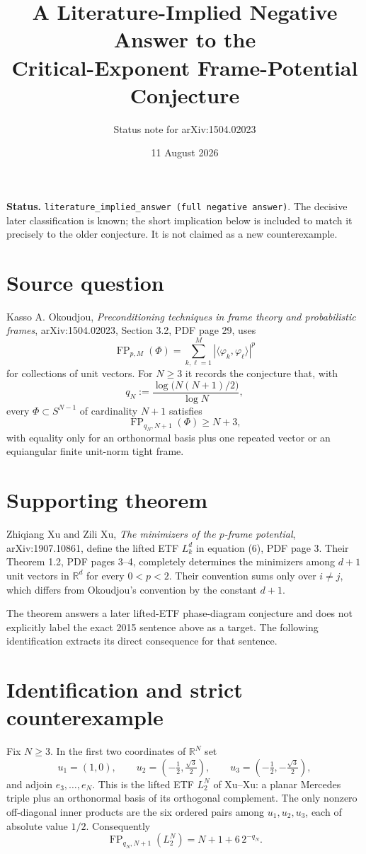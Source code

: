 \documentclass[11pt]{article}
\title{A Literature-Implied Negative Answer to the\\
Critical-Exponent Frame-Potential Conjecture}
\author{Status note for arXiv:1504.02023}
\date{11 August 2026}
\newcommand{\FP}{\operatorname{FP}}
\newcommand{\R}{\mathbb{R}}
\begin{document}
\maketitle

\noindent\textbf{Status.}
\texttt{literature\_implied\_answer (full negative answer)}.  The decisive
later classification is known; the short implication below is included to
match it precisely to the older conjecture.  It is not claimed as a new
counterexample.

\section*{Source question}

Kasso A. Okoudjou, \emph{Preconditioning techniques in frame theory and
probabilistic frames}, arXiv:1504.02023, Section 3.2, PDF page 29, uses
\[
  \FP_{p,M}(\Phi)=\sum_{k,\ell=1}^{M}
  |\langle\varphi_k,\varphi_\ell\rangle|^p
\]
for collections of unit vectors.  For $N\ge3$ it records the conjecture that,
with
\[
  q_N:=\frac{\log\!\bigl(N(N+1)/2\bigr)}{\log N},
\]
every $\Phi\subset S^{N-1}$ of cardinality $N+1$ satisfies
\[
  \FP_{q_N,N+1}(\Phi)\ge N+3,
\]
with equality only for an orthonormal basis plus one repeated vector or an
equiangular finite unit-norm tight frame.

\section*{Supporting theorem}

Zhiqiang Xu and Zili Xu, \emph{The minimizers of the $p$-frame potential},
arXiv:1907.10861, define the lifted ETF $L_k^d$ in equation (6), PDF page 3.
Their Theorem 1.2, PDF pages 3--4, completely determines the minimizers among
$d+1$ unit vectors in $\R^d$ for every $0<p<2$.  Their convention sums only
over $i\ne j$, which differs from Okoudjou's convention by the constant
$d+1$.

The theorem answers a later lifted-ETF phase-diagram conjecture and does not
explicitly label the exact 2015 sentence above as a target.  The following
identification extracts its direct consequence for that sentence.

\section*{Identification and strict counterexample}

Fix $N\ge3$.  In the first two coordinates of $\R^N$ set
\[
 u_1=(1,0),\qquad
 u_2=(-\tfrac12,\tfrac{\sqrt3}{2}),\qquad
 u_3=(-\tfrac12,-\tfrac{\sqrt3}{2}),
\]
and adjoin $e_3,\ldots,e_N$.  This is the lifted ETF $L_2^N$ of Xu--Xu:
a planar Mercedes triple plus an orthonormal basis of its orthogonal
complement.  The only nonzero off-diagonal inner products are the six ordered
pairs among $u_1,u_2,u_3$, each of absolute value $1/2$.  Consequently
\[
  \FP_{q_N,N+1}(L_2^N)=N+1+6\,2^{-q_N}.
\]
\end{document}
